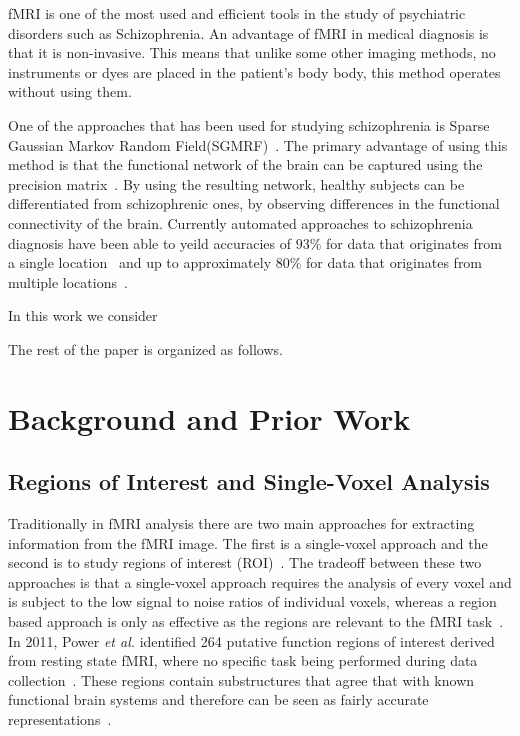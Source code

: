 \documentclass{article} %
\begin{document}
fMRI is one of the most used and efficient tools in the study of 
psychiatric disorders such as Schizophrenia\cite{}. An advantage of fMRI in
medical diagnosis is that it is non-invasive. This means that unlike some 
other imaging methods, no instruments or dyes are placed in the patient’s body
body, this method operates without using them\cite{}. 

One of the approaches that has been used for studying schizophrenia is 
Sparse Gaussian Markov Random Field(SGMRF)~\cite{Rish_2013}\cite{Rosa_2013}. 
The primary advantage of using this method is that the functional network of 
the brain can be captured using the precision matrix~\cite{Rish_2013}.
By using the resulting network, healthy subjects can be differentiated from 
schizophrenic ones, by observing differences in the functional connectivity 
of the brain. Currently automated approaches to schizophrenia
diagnosis have been able to yeild accuracies of $93\%$ for data that 
originates from a single location~\cite{Rish_2013} and up to approximately 
$80\%$ for data that originates from multiple locations~\cite{Cheng2015}.

In this work we consider

The rest of the paper is organized as follows.


\section{Background and Prior Work}

\subsection{Regions of Interest and Single-Voxel Analysis}
Traditionally in fMRI analysis there are two main approaches for extracting
information from the fMRI image. The first is a single-voxel approach and 
the second is to study regions of interest (ROI)~\cite{heller2006cluster}. 
The tradeoff between these two approaches is that a single-voxel approach
requires the analysis of every voxel and is subject to the low signal to 
noise ratios of individual voxels, whereas a region based approach is only
as effective as the regions are relevant to the fMRI 
task~\cite{heller2006cluster}. In 2011, Power \emph{et al.} identified 264 
putative function regions of interest derived from resting state fMRI, where 
no specific task being performed during data collection~\cite{Power_2011}. 
These regions contain substructures that agree that with known functional 
brain systems and therefore can be seen as fairly accurate 
representations~\cite{Power_2011}.
\end{document}
